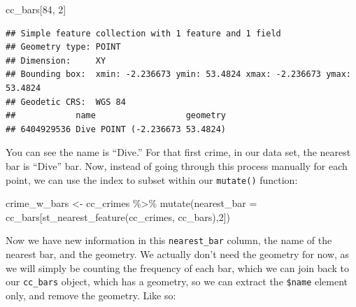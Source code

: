 \documentclass[
]{book}
\newenvironment{Shaded}{\begin{snugshade}}{\end{snugshade}}
\newcommand{\AttributeTok}[1]{\textcolor[rgb]{0.77,0.63,0.00}{#1}}
\newcommand{\CommentTok}[1]{\textcolor[rgb]{0.56,0.35,0.01}{\textit{#1}}}
\newcommand{\DecValTok}[1]{\textcolor[rgb]{0.00,0.00,0.81}{#1}}
\newcommand{\FunctionTok}[1]{\textcolor[rgb]{0.00,0.00,0.00}{#1}}
\newcommand{\NormalTok}[1]{#1}
\newcommand{\OtherTok}[1]{\textcolor[rgb]{0.56,0.35,0.01}{#1}}
\newcommand{\SpecialCharTok}[1]{\textcolor[rgb]{0.00,0.00,0.00}{#1}}
\newcommand{\StringTok}[1]{\textcolor[rgb]{0.31,0.60,0.02}{#1}}
\begin{document}
\begin{Shaded}
\begin{Highlighting}[]
\NormalTok{cc\_bars[}\DecValTok{84}\NormalTok{, }\DecValTok{2}\NormalTok{]}
\end{Highlighting}
\end{Shaded}

\begin{verbatim}
## Simple feature collection with 1 feature and 1 field
## Geometry type: POINT
## Dimension:     XY
## Bounding box:  xmin: -2.236673 ymin: 53.4824 xmax: -2.236673 ymax: 53.4824
## Geodetic CRS:  WGS 84
##            name                  geometry
## 6404929536 Dive POINT (-2.236673 53.4824)
\end{verbatim}

You can see the name is ``Dive.'' For that first crime, in our data set, the nearest bar is ``Dive'' bar. Now, instead of going through this process manually for each point, we can use the index to subset within our \texttt{mutate()} function:

\begin{Shaded}
\begin{Highlighting}[]
\NormalTok{crime\_w\_bars  }\OtherTok{\textless{}{-}}\NormalTok{ cc\_crimes }\SpecialCharTok{\%\textgreater{}\%} \FunctionTok{mutate}\NormalTok{(}\AttributeTok{nearest\_bar =}\NormalTok{ cc\_bars[}\FunctionTok{st\_nearest\_feature}\NormalTok{(cc\_crimes, cc\_bars),}\DecValTok{2}\NormalTok{])}
\end{Highlighting}
\end{Shaded}

Now we have new information in this \texttt{nearest\_bar} column, the name of the nearest bar, and the geometry. We actually don't need the geometry for now, as we will simply be counting the frequency of each bar, which we can join back to our \texttt{cc\_bars} object, which has a geometry, so we can extract the \texttt{\$name} element only, and remove the geometry. Like so:

\begin{Shaded}
\end{Shaded}
\end{document}
